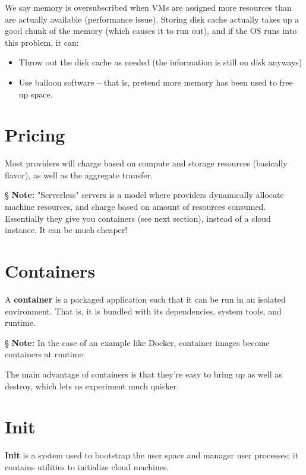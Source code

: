 \documentclass{report}
\newcommand{\npar}{\par\noindent}
\newcommand{\vpar}{\vspace{1em}\npar}
\newcommand{\note}{\vpar \S \textbf{ Note: }}
\begin{document}
\vpar We say memory is oversubscribed when VMs are assigned more resources than are actually available (performance issue). Storing disk cache actually takes up a good chunk of the memory (which causes it to run out), and if the OS runs into this problem, it can:

\begin{itemize}
    \item Throw out the disk cache as needed (the information is still on disk anyways)
    \item Use balloon software -- that is, pretend more memory has been used to free up space.
\end{itemize}

\section{Pricing}

\par Most providers will charge based on compute and storage resources (basically flavor), as well as the aggregate transfer.

\note "Serverless" servers is a model where providers dynamically allocate machine resources, and charge based on amount of resources consumed. Essentially they give you containers (see next section), instead of a cloud instance. It can be much cheaper!

\section{Containers}

\par A \textbf{container} is a packaged application such that it can be run in an isolated environment. That is, it is bundled with its dependencies, system tools, and runtime.

\note In the case of an example like Docker, container images become containers at runtime.

\vpar The main advantage of containers is that they're easy to bring up as well as destroy, which lets us experiment much quicker.

\section{Init}

\par \textbf{Init} is a system used to bootstrap the user space and manager user processes; it contains utilities to initialize cloud machines.
\end{document}
